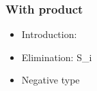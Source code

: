 \documentclass{beamer}
\begin{document}
  \begin{frame}
    \frametitle{With product}
    \begin{itemize}
    \item Introduction:
                {\ctx{\Gamma}{\Delta} \vdash {} \ni {}}
    \item Elimination:
                {\ctx{\Gamma}{\Delta} \vdash {} \in S_i}
    \item Negative type
    \end{itemize}
  \end{frame}
\end{document}
